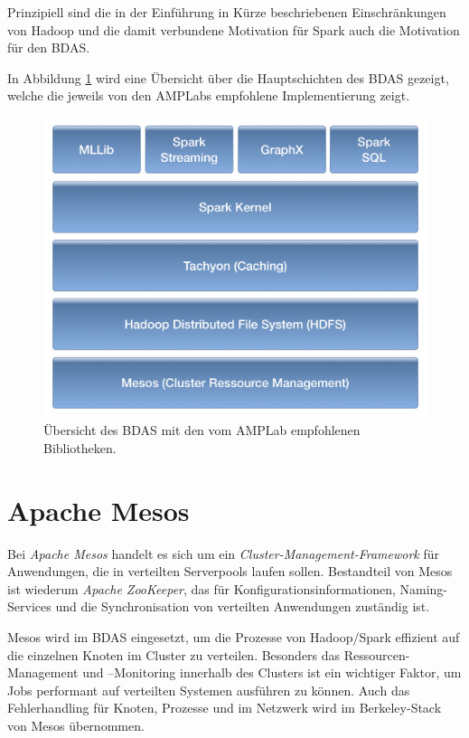 Prinzipiell sind die in der Einführung in Kürze beschriebenen Einschränkungen von Hadoop und die damit verbundene Motivation für Spark auch die Motivation für den BDAS. 


In Abbildung \ref{fig:BDAS1} wird eine Übersicht über die Hauptschichten des BDAS gezeigt, welche die jeweils von den AMPLabs empfohlene Implementierung zeigt.

\begin{figure}[htb!]
\centering
\includegraphics[width=1.0\textwidth]{bilder/BDAS.png}
\caption{Übersicht des BDAS mit den vom AMPLab empfohlenen Bibliotheken.}
\label{fig:BDAS1}
\end{figure}
 


\section{Apache Mesos}
\label{section:apache Mesos}


Bei \textit{Apache Mesos} handelt es sich um ein \textit{Cluster-Management-Framework} für Anwendungen, die in verteilten Serverpools laufen sollen. Bestandteil von Mesos ist wiederum \textit{Apache ZooKeeper}, das für Konfigurationsinformationen, Naming-Services und die Synchronisation von verteilten Anwendungen zuständig ist.  

Mesos wird im BDAS eingesetzt, um die Prozesse von Hadoop/Spark effizient auf die einzelnen Knoten im Cluster zu verteilen. Besonders das Ressourcen-Management und –Monitoring innerhalb des Clusters ist ein wichtiger Faktor, um Jobs performant auf verteilten Systemen ausführen zu können. Auch das Fehlerhandling für Knoten, Prozesse und im Netzwerk wird im Berkeley-Stack von Mesos übernommen. 


